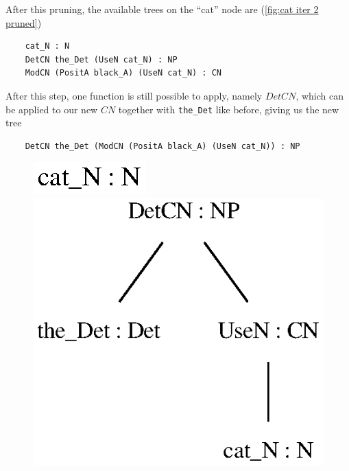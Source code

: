 After this pruning, the available trees on the ``cat'' node are (\autoref{fig:cat iter 2 pruned})
\begin{lstlisting}
    cat_N : N
    DetCN the_Det (UseN cat_N) : NP
    ModCN (PositA black_A) (UseN cat_N) : CN
\end{lstlisting}
After this step, one function is still possible to apply, namely $DetCN$, which can be applied to our new $CN$ together with \lstinline{the_Det} like before, giving us the new tree
\begin{lstlisting}
    DetCN the_Det (ModCN (PositA black_A) (UseN cat_N)) : NP
\end{lstlisting}

\begin{figure}[H]
    \centering
        {\includegraphics[scale=0.75]{thesis/figure/black_cats/cat_N_gf.eps}}
        {\includegraphics[scale=0.75]{thesis/figure/black_cats/the_cat_NP_gf.eps}}

\end{figure}
